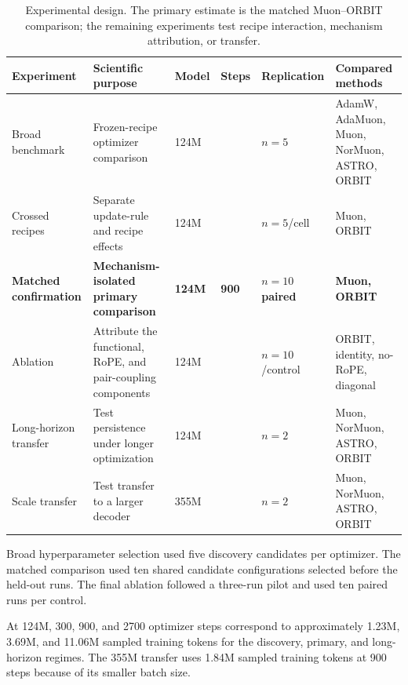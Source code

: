 \begin{table}[t]
\centering
\caption{Experimental design. The primary estimate is the matched Muon--ORBIT comparison;
the remaining experiments test recipe interaction, mechanism attribution, or transfer.}
\label{tab:protocol}
\small
\setlength{\tabcolsep}{4pt}
\renewcommand{\arraystretch}{1.12}
\begin{tabularx}{\textwidth}{@{}
>{\raggedright\arraybackslash}p{2.05cm}
>{\raggedright\arraybackslash}X
>{\centering\arraybackslash}p{0.95cm}
>{\centering\arraybackslash}p{0.85cm}
>{\centering\arraybackslash}p{1.35cm}
>{\raggedright\arraybackslash}p{3.1cm}
@{}}
\toprule
Experiment & Scientific purpose & Model & Steps & Replication & Compared methods \\
\midrule
Broad benchmark &
Frozen-recipe optimizer comparison &
124M & 900 & $n=5$ &
AdamW, AdaMuon, Muon, NorMuon, ASTRO, ORBIT \\

Crossed recipes &
Separate update-rule and recipe effects &
124M & 900 & $n=5$/cell &
Muon, ORBIT \\

\textbf{Matched confirmation} &
\textbf{Mechanism-isolated primary comparison} &
\textbf{124M} & \textbf{900} & \textbf{$n=10$ paired} &
\textbf{Muon, ORBIT} \\

Ablation &
Attribute the functional, RoPE, and pair-coupling components &
124M & 900 & $n=10$/control &
ORBIT, identity, no-RoPE, diagonal \\

Long-horizon transfer &
Test persistence under longer optimization &
124M & 2700 & $n=2$ &
Muon, NorMuon, ASTRO, ORBIT \\

Scale transfer &
Test transfer to a larger decoder &
355M & 900 & $n=2$ &
Muon, NorMuon, ASTRO, ORBIT \\
\bottomrule
\end{tabularx}

\vspace{0.35em}
\footnotesize
Broad hyperparameter selection used five discovery candidates per optimizer. The matched
comparison used ten shared candidate configurations selected before the held-out runs. The
final ablation followed a three-run pilot and used ten paired runs per control.
\end{table}

At 124M, 300, 900, and 2700 optimizer steps correspond to approximately 1.23M, 3.69M,
and 11.06M sampled training tokens for the discovery, primary, and long-horizon regimes.
The 355M transfer uses 1.84M sampled training tokens at 900 steps because of its smaller
batch size.


